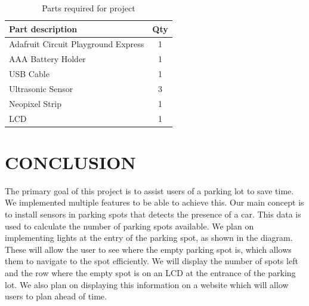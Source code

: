 \documentclass[12pt]{article}
\begin{document}
\begin{table}[!h]
  \caption{Parts required for project}
  \label{table:parts_list}
  \begin{center}
  \begin{tabular}{|p{3in}|c|}
  
  \hline
  Part description & Qty\\
  \hline
  \hline
  Adafruit Circuit Playground Express & 1 \\
  \hline
  AAA Battery Holder & 1 \\
  \hline
  USB Cable & 1 \\
  \hline
  Ultrasonic Sensor & 3 \\
  \hline
  Neopixel Strip & 1 \\
  \hline
  LCD & 1 \\
  \hline
  \end{tabular}
  \end{center}
\end{table}
\section{CONCLUSION}
The primary goal of this project is to assist users of a parking lot to save time. We implemented multiple features to be able to achieve this. Our main concept is to install sensors in parking spots that detects the presence of a car. This data is used to calculate the number of parking spots available. We plan on implementing lights at the entry of the parking spot, as shown in the diagram. These will allow the user to see where the empty parking spot is, which allows them to navigate to the spot efficiently. We will display the number of spots left and the row where the empty spot is on an LCD at the entrance of the parking lot. We also plan on displaying this information on a website which will allow users to plan ahead of time.

\newpage
\printbibliography[heading=subbibintoc]
%
%
\end{document}

